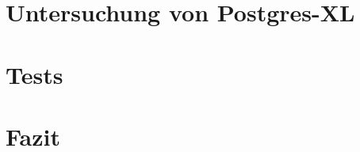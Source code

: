 \documentclass{beamer}
\begin{document}
\section{Untersuchung von Postgres-XL}

\section{Tests}

\section{Fazit}
 
\begin{frame}\frametitle{}


\end{frame}
\end{document}
